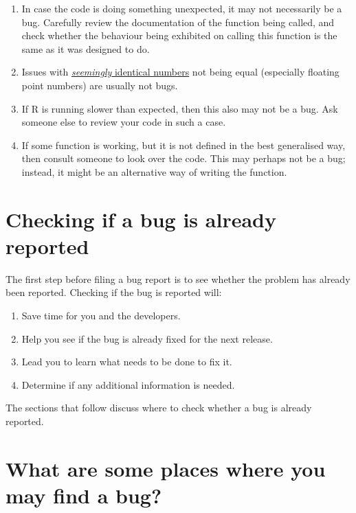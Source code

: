 \documentclass[
]{book}
\begin{document}
\begin{enumerate}
\def\labelenumi{\arabic{enumi}.}
\item
  In case the code is doing something unexpected, it may not necessarily be a bug. Carefully review the documentation of the function being called, and check whether the behaviour being exhibited on calling this function is the same as it was designed to do.
\item
  Issues with \href{https://cran.r-project.org/doc/FAQ/R-FAQ.html\#Why-doesn_0027t-R-think-these-numbers-are-equal_003f}{\emph{seemingly} identical numbers} not being equal (especially floating point numbers) are usually not bugs.
\item
  If R is running slower than expected, then this also may not be a bug. Ask someone else to review your code in such a case.
\item
  If some function is working, but it is not defined in the best generalised way, then consult someone to look over the code. This may perhaps not be a bug; instead, it might be an alternative way of writing the function.
\end{enumerate}

\hypertarget{checking-if-a-bug-is-already-reported}{%
\section{Checking if a bug is already reported}\label{checking-if-a-bug-is-already-reported}}

The first step before filing a bug report is to see whether the problem has already been reported. Checking if the bug is reported will:

\begin{enumerate}
\def\labelenumi{\arabic{enumi}.}
\item
  Save time for you and the developers.
\item
  Help you see if the bug is already fixed for the next release.
\item
  Lead you to learn what needs to be done to fix it.
\item
  Determine if any additional information is needed.
\end{enumerate}

The sections that follow discuss where to check whether a bug is already reported.

\hypertarget{what-are-some-places-where-you-may-find-a-bug}{%
\section{What are some places where you may find a bug?}\label{what-are-some-places-where-you-may-find-a-bug}}
\end{document}
